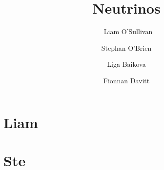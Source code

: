 \documentclass[10pt,twoside]{report}
\title{Neutrinos}
\author{\
    Liam O'Sullivan \and
    Stephan O'Brien \and
    Liga Baikova \and
    Fionnan Davitt
}
\begin{document}
\maketitle

\tableofcontents

\chapter{Liam}


\chapter{Ste}





\end{document}
